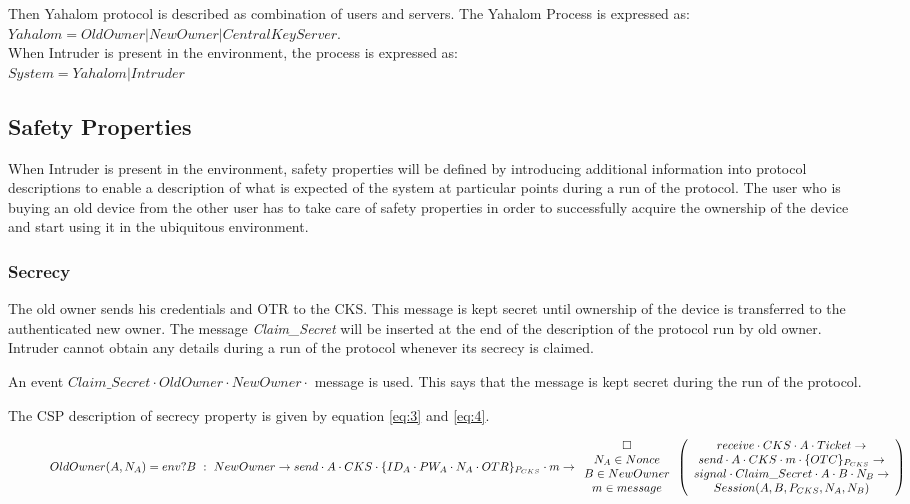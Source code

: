 \documentclass[letterpaper]{article}
\begin{document}
Then Yahalom protocol is described as combination of users and servers. The Yahalom Process is expressed as:\\

$Yahalom = OldOwner | NewOwner | Central Key Server$.\\

When Intruder is present in the environment, the process is expressed as:\\
$System = Yahalom | Intruder$\\

\subsection{Safety Properties}
When Intruder is present in the environment, safety properties will be defined by introducing additional information into protocol descriptions to enable a description of what is expected of the system at particular points during a run of the protocol. The user who is buying an old device from the other user has to take care of safety properties in order to successfully acquire the ownership of the device and start using it in the ubiquitous environment.
\subsubsection{Secrecy}	
The old owner sends his credentials and OTR to the CKS.	This message is kept secret until ownership of the device is transferred to the authenticated new owner. The message \textit{Claim\_Secret} will be inserted at the end of the description of the protocol run by old owner. Intruder cannot obtain any details during a run of the protocol whenever its secrecy is claimed.
\par An event $Claim\_Secret \cdot OldOwner \cdot NewOwner \cdot$ message is used. This says that the message is kept secret during the run of the protocol.

The CSP description of secrecy property is given by equation \eqref{eq:3} and \eqref{eq:4}.
\begin{figure*}[bpht!]
\begin{dmath}\label{eq:3}
OldOwner(A,N_{A})=env?B \ :\ NewOwner \rightarrow send \cdot A \cdot CKS \cdot \{ID_{A}\cdot PW_{A} \cdot N_{A} \cdot OTR\}_{P_{CKS}} \cdot m \rightarrow \\
\begin{array}{c} \square \\N_{A}\in Nonce \\ B \in NewOwner \\ m \in  message \end{array} \left(\begin{array}{c} receive \cdot CKS \cdot A \cdot Ticket \rightarrow \\ send \cdot A \cdot CKS \cdot m \cdot \{OTC\}_{P_{CKS}}\rightarrow \\ 
signal \cdot Claim\_Secret \cdot A \cdot B \cdot N_{B}\rightarrow \\
Session(A,B,P_{CKS},N_{A},N_{B})\end{array} \right)
\end{dmath}
\end{figure*}
\end{document}

